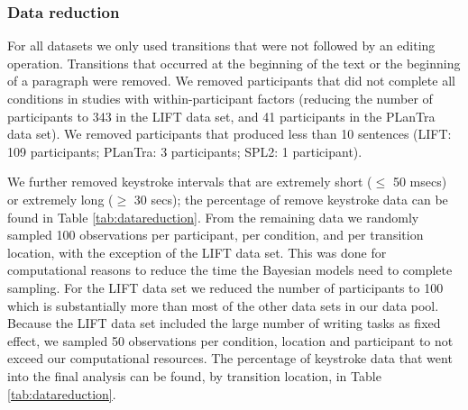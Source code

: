 \documentclass[
  english,
  man,floatsintext]{apa7}
\begin{document}
\hypertarget{data-reduction}{%
\subsubsection{Data reduction}\label{data-reduction}}

For all datasets we only used transitions that were not followed by an editing operation. Transitions that occurred at the beginning of the text or the beginning of a paragraph were removed. We removed participants that did not complete all conditions in studies with within-participant factors (reducing the number of participants to 343 in the LIFT data set, and 41 participants in the PLanTra data set). We removed participants that produced less than 10 sentences (LIFT: 109 participants; PLanTra: 3 participants; SPL2: 1 participant).

We further removed keystroke intervals that are extremely short (\(\le\) 50 msecs) or extremely long (\(\ge\) 30 secs); the percentage of remove keystroke data can be found in Table \ref{tab:datareduction}. From the remaining data we randomly sampled 100 observations per participant, per condition, and per transition location, with the exception of the LIFT data set. This was done for computational reasons to reduce the time the Bayesian models need to complete sampling. For the LIFT data set we reduced the number of participants to 100 which is substantially more than most of the other data sets in our data pool. Because the LIFT data set included the large number of writing tasks as fixed effect, we sampled 50 observations per condition, location and participant to not exceed our computational resources. The percentage of keystroke data that went into the final analysis can be found, by transition location, in Table \ref{tab:datareduction}.
\end{document}
